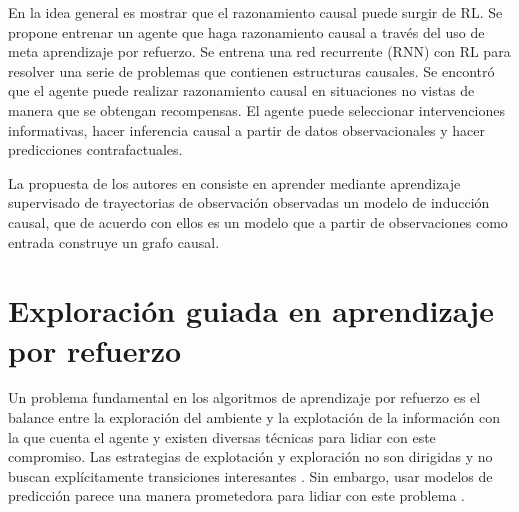 En \cite{dasgupta2019causal} la idea general es mostrar que el razonamiento
causal puede surgir de RL. 
Se propone entrenar un agente que haga razonamiento causal a través del uso de  meta aprendizaje por refuerzo. Se entrena una red recurrente (RNN) con RL para resolver una serie de problemas que contienen estructuras causales.
Se encontró que el agente puede realizar razonamiento causal en situaciones
no vistas de manera que se obtengan recompensas. El agente
puede seleccionar intervenciones informativas, hacer inferencia causal a partir
de datos observacionales y hacer predicciones contrafactuales.



La propuesta de los autores en \cite{nair2019causal} consiste en
aprender mediante aprendizaje supervisado de trayectorias 
de observación observadas un modelo de inducción causal, que de acuerdo con ellos es un modelo que a partir
de observaciones como entrada construye un grafo causal.


\section{Exploración guiada en aprendizaje por refuerzo}

Un problema fundamental en los algoritmos de aprendizaje por refuerzo
es el balance entre la exploración del ambiente y la explotación
de la información con la que cuenta el agente y existen diversas técnicas para lidiar con este compromiso.
Las estrategias de explotación y exploración no 
son dirigidas y no buscan explícitamente transiciones
interesantes \cite{mcfarlane2018survey}.
Sin embargo, usar modelos de predicción parece una manera 
prometedora para lidiar con este problema \cite{hafner2019dream}.
 
